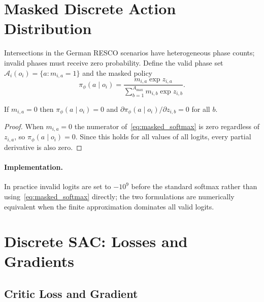 \section{Masked Discrete Action Distribution}
\label{sec:Appendix_masked_softmax}

Intersections in the German RESCO scenarios have heterogeneous phase counts; invalid phases must receive zero probability. Define the valid phase set $\mathcal{A}_i(o_i) = \{a : m_{i,a}=1\}$ and the masked policy
\begin{equation}
  \pi_\phi(a\mid o_i)
  = \frac{m_{i,a}\exp z_{i,a}}
         {\displaystyle\sum_{b=1}^{A_{\max}}m_{i,b}\exp z_{i,b}}.
  \label{eq:masked_softmax}
\end{equation}

\begin{proposition}
\label{prop:masked_zero}
If $m_{i,a}=0$ then $\pi_\phi(a\mid o_i)=0$ and $\partial\pi_\phi(a\mid o_i)/\partial z_{i,b}=0$ for all $b$.
\end{proposition}
\begin{proof}
When $m_{i,a}=0$ the numerator of~\eqref{eq:masked_softmax} is zero regardless of $z_{i,a}$, so $\pi_\phi(a\mid o_i)=0$. Since this holds for all values of all logits, every partial derivative is also zero.
\end{proof}

\paragraph{Implementation.} In practice invalid logits are set to $-10^9$ before the standard softmax rather than using~\eqref{eq:masked_softmax} directly; the two formulations are numerically equivalent when the finite approximation dominates all valid logits.

\section{Discrete SAC: Losses and Gradients}
\label{sec:Appendix_SAC_gradients}

\subsection{Critic Loss and Gradient}
\label{sec:Appendix_critic_loss}

